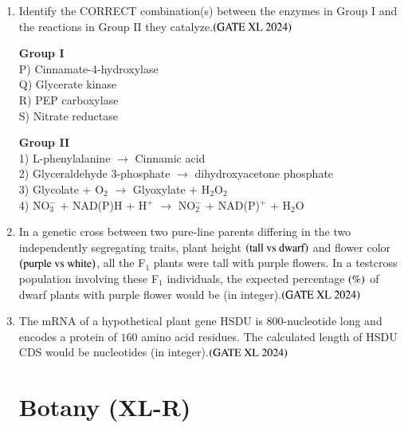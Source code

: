 \documentclass[journal]{IEEEtran}
\begin{document}
\begin{enumerate}
    \item Identify the CORRECT combination(s) between the enzymes in Group I and the reactions in Group II they catalyze.\hfill $\left(\text{GATE XL 2024}\right)$
    \begin{multicols}{2}
    \noindent \textbf{Group I} \\
    P) Cinnamate-4-hydroxylase \\
    Q) Glycerate kinase \\
    R) PEP carboxylase \\
    S) Nitrate reductase \\

    \columnbreak

    \noindent \textbf{Group II} \\
    1) L-phenylalanine $\rightarrow$ Cinnamic acid \\
    2) Glyceraldehyde 3-phosphate $\rightarrow$ dihydroxyacetone phosphate \\
    3) Glycolate + O$_2$ $\rightarrow$ Glyoxylate + H$_2$O$_2$ \\
    4) NO$_3^-$ + NAD(P)H + H$^+$ $\rightarrow$ NO$_2^-$ + NAD(P)$^+$ + H$_2$O \\
    \end{multicols}

    \item In a genetic cross between two pure-line parents differing in the two independently segregating traits, plant height $\left(\text{tall vs dwarf}\right)$ and flower color $\left(\text{purple vs white}\right)$, all the F$_1$ plants were tall with purple flowers. In a testcross population involving these F$_1$ individuals, the expected percentage $\left(\%\right)$ of dwarf plants with purple flower would be (in integer).\hfill $\left(\text{GATE XL 2024}\right)$

    \item The mRNA of a hypothetical plant gene HSDU is $800$-nucleotide long and encodes a protein of $160$ amino acid residues. The calculated length of HSDU CDS would be nucleotides (in integer).\hfill $\left(\text{GATE XL 2024}\right)$

\maketitle
\section*{Botany (XL-R)}

\end{enumerate}
\end{document}
